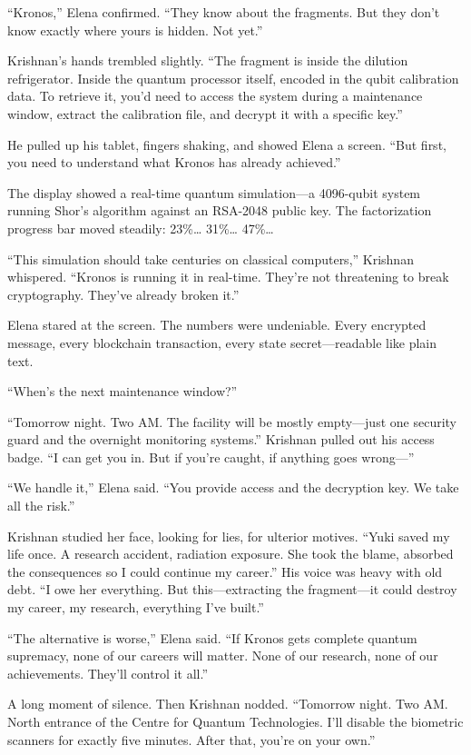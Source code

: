 ``Kronos,'' Elena confirmed. ``They know about the fragments. But they
don't know exactly where yours is hidden. Not yet.''

Krishnan's hands trembled slightly. ``The fragment is inside the
dilution refrigerator. Inside the quantum processor itself, encoded in
the qubit calibration data. To retrieve it, you'd need to access the
system during a maintenance window, extract the calibration file, and
decrypt it with a specific key.''

He pulled up his tablet, fingers shaking, and showed Elena a screen.
``But first, you need to understand what Kronos has already achieved.''

The display showed a real-time quantum simulation---a 4096-qubit system
running Shor's algorithm against an RSA-2048 public key. The
factorization progress bar moved steadily: 23\%\ldots{} 31\%\ldots{}
47\%\ldots{}

``This simulation should take centuries on classical computers,''
Krishnan whispered. ``Kronos is running it in real-time. They're not
threatening to break cryptography. They've already broken it.''

Elena stared at the screen. The numbers were undeniable. Every encrypted
message, every blockchain transaction, every state secret---readable
like plain text.

``When's the next maintenance window?''

``Tomorrow night. Two AM. The facility will be mostly empty---just one
security guard and the overnight monitoring systems.'' Krishnan pulled
out his access badge. ``I can get you in. But if you're caught, if
anything goes wrong---''

``We handle it,'' Elena said. ``You provide access and the decryption
key. We take all the risk.''

Krishnan studied her face, looking for lies, for ulterior motives.
``Yuki saved my life once. A research accident, radiation exposure. She
took the blame, absorbed the consequences so I could continue my
career.'' His voice was heavy with old debt. ``I owe her everything. But
this---extracting the fragment---it could destroy my career, my
research, everything I've built.''

``The alternative is worse,'' Elena said. ``If Kronos gets complete
quantum supremacy, none of our careers will matter. None of our
research, none of our achievements. They'll control it all.''

A long moment of silence. Then Krishnan nodded. ``Tomorrow night. Two
AM. North entrance of the Centre for Quantum Technologies. I'll disable
the biometric scanners for exactly five minutes. After that, you're on
your own.''

